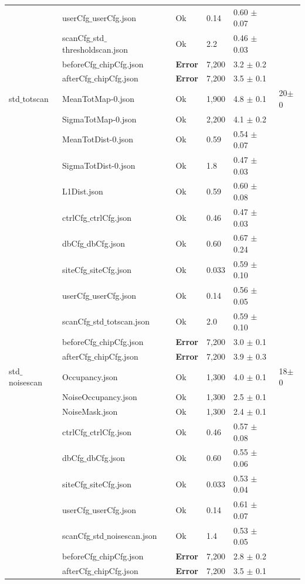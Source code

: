 {\begin{longtable}{|llllll|}
 & userCfg$\_$userCfg.json & Ok & 0.14 & 0.60 $\pm$ 0.07 & \\
 & scanCfg$\_$std$\_$thresholdscan.json & Ok & 2.2 & 0.46 $\pm$ 0.03 & \\
 & beforeCfg$\_$chipCfg.json & { \bf Error} & 7,200 & 3.2 $\pm$ 0.2 & \\
 & afterCfg$\_$chipCfg.json & { \bf Error} & 7,200 & 3.5 $\pm$ 0.1 & \\
\hline
std$\_$totscan & MeanTotMap-0.json & Ok & 1,900 & 4.8 $\pm$ 0.1 & 20$\pm$0\\
 & SigmaTotMap-0.json & Ok & 2,200 & 4.1 $\pm$ 0.2 & \\
 & MeanTotDist-0.json & Ok & 0.59 & 0.54 $\pm$ 0.07 & \\
 & SigmaTotDist-0.json & Ok & 1.8 & 0.47 $\pm$ 0.03 & \\
 & L1Dist.json & Ok & 0.59 & 0.60 $\pm$ 0.08 & \\
 & ctrlCfg$\_$ctrlCfg.json & Ok & 0.46 & 0.47 $\pm$ 0.03 & \\
 & dbCfg$\_$dbCfg.json & Ok & 0.60 & 0.67 $\pm$ 0.24 & \\
 & siteCfg$\_$siteCfg.json & Ok & 0.033 & 0.59 $\pm$ 0.10 & \\
 & userCfg$\_$userCfg.json & Ok & 0.14 & 0.56 $\pm$ 0.05 & \\
 & scanCfg$\_$std$\_$totscan.json & Ok & 2.0 & 0.59 $\pm$ 0.10 & \\
 & beforeCfg$\_$chipCfg.json & { \bf Error} & 7,200 & 3.0 $\pm$ 0.1 & \\
 & afterCfg$\_$chipCfg.json & { \bf Error} & 7,200 & 3.9 $\pm$ 0.3 & \\
\hline
std$\_$noisescan & Occupancy.json & Ok & 1,300 & 4.0 $\pm$ 0.1 & 18$\pm$0\\
 & NoiseOccupancy.json & Ok & 1,300 & 2.5 $\pm$ 0.1 & \\
 & NoiseMask.json & Ok & 1,300 & 2.4 $\pm$ 0.1 & \\
 & ctrlCfg$\_$ctrlCfg.json & Ok & 0.46 & 0.57 $\pm$ 0.08 & \\
 & dbCfg$\_$dbCfg.json & Ok & 0.60 & 0.55 $\pm$ 0.06 & \\
 & siteCfg$\_$siteCfg.json & Ok & 0.033 & 0.53 $\pm$ 0.04 & \\
 & userCfg$\_$userCfg.json & Ok & 0.14 & 0.61 $\pm$ 0.07 & \\
 & scanCfg$\_$std$\_$noisescan.json & Ok & 1.4 & 0.53 $\pm$ 0.05 & \\
 & beforeCfg$\_$chipCfg.json & { \bf Error} & 7,200 & 2.8 $\pm$ 0.2 & \\
 & afterCfg$\_$chipCfg.json & { \bf Error} & 7,200 & 3.5 $\pm$ 0.1 & \\
\hline
\end{longtable}
}


